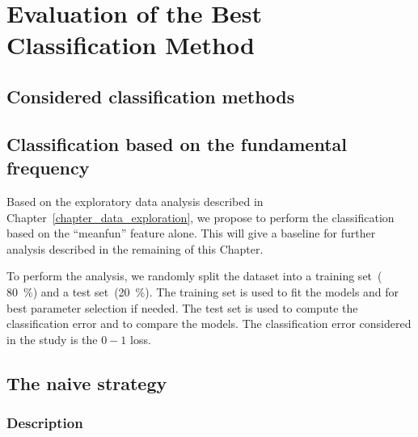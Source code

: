 \chapter{Evaluation of the Best Classification Method}
\label{chapter_classification}
\section{Considered classification methods}
\label{sec_considered_classif}

\section{Classification based on the fundamental frequency}
\label{sec_intuitive_approach}
Based on the exploratory data analysis described in Chapter~\ref{chapter_data_exploration}, we propose to perform the classification based on the ``meanfun'' feature alone. 
This will give a baseline for further analysis described in the remaining of this Chapter.

To perform the analysis, we randomly split the dataset into a training set~( \SI{80}{\percent}) and a test set~(\SI{20}{\percent}). The training set is used to fit the models and for best parameter selection if needed. The test set is used to compute the classification error and to compare the models. The classification error considered in the study is the $0-1$ loss.
 
\section{The naive strategy}
\label{sec_naive_strat}
\subsection{Description}
